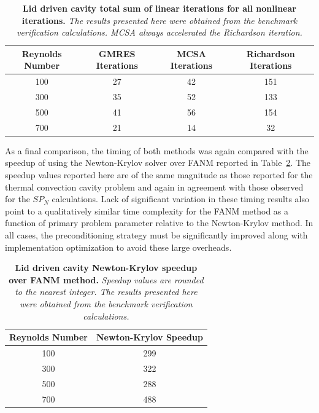 \begin{table}[h!]
  \begin{center}
    \begin{tabular}{cccc}\hline\hline
      \multicolumn{1}{c}{Reynolds Number}& 
      \multicolumn{1}{c}{GMRES Iterations}&
      \multicolumn{1}{c}{MCSA Iterations}&
      \multicolumn{1}{c}{Richardson Iterations}\\
      \hline
      100 & 27 & 42 & 151\\
      300 & 35 & 52 & 133\\
      500 & 41 & 56 & 154\\
      700 & 21 & 14 & 32\\
      \hline\hline
    \end{tabular}
  \end{center}
  \caption{\textbf{Lid driven cavity total sum of linear iterations
      for all nonlinear iterations.} \textit{The results presented
      here were obtained from the benchmark verification
      calculations. MCSA always accelerated the Richardson
      iteration.}}
  \label{tab:driven_linear_iter_comparison}
\end{table}

As a final comparison, the timing of both methods was again compared
with the speedup of using the Newton-Krylov solver over FANM reported
in Table~\ref{tab:driven_speedup_comparison}. The speedup values
reported here are of the same magnitude as those reported for the
thermal convection cavity problem and again in agreement with those
observed for the $SP_N$ calculations. Lack of significant variation in
these timing results also point to a qualitatively similar time
complexity for the FANM method as a function of primary problem
parameter relative to the Newton-Krylov method. In all cases, the
preconditioning strategy must be significantly improved along with
implementation optimization to avoid these large overheads.

\begin{table}[h!]
  \begin{center}
    \begin{tabular}{cc}\hline\hline
      \multicolumn{1}{c}{Reynolds Number}& 
      \multicolumn{1}{c}{Newton-Krylov Speedup}\\
      \hline
      100 & 299 \\
      300 & 322 \\
      500 & 288 \\
      700 & 488 \\
      \hline\hline
    \end{tabular}
  \end{center}
  \caption{\textbf{Lid driven cavity Newton-Krylov speedup over FANM
      method.} \textit{Speedup values are rounded to the nearest
      integer. The results presented here were obtained from the
      benchmark verification calculations.}}
  \label{tab:driven_speedup_comparison}
\end{table}

